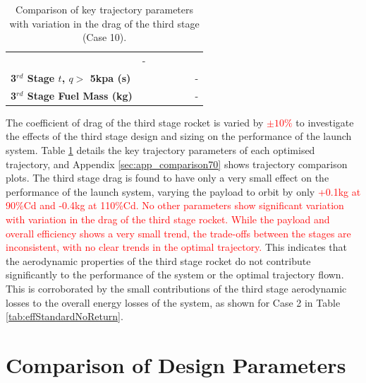 \begin{table}[ht]
\begin{tabular}{l c c c c c c}
			& -
			\\
			\textbf{3$^{rd}$ Stage $t$, $q >$ 5kpa (s)}
			& \thirdqOverFiveCdThreeNinetyNoReturn
			& \thirdqOverFiveCdThreeNinetyFiveNoReturn
			& \thirdqOverFiveCdThreeStandardNoReturn
			& \thirdqOverFiveCdThreeOneOneHundredFiveNoReturn
			& \thirdqOverFiveCdThreeOneHundredTenNoReturn
			& -
			\\
			\textbf{3$^{rd}$ Stage Fuel Mass (kg)}
			& \thirdmFuelCdThreeNinetyNoReturn
			& \thirdmFuelCdThreeNinetyFiveNoReturn
			& \thirdmFuelCdThreeStandardNoReturn
			& \thirdmFuelCdThreeOneOneHundredFiveNoReturn
			& \thirdmFuelCdThreeOneHundredTenNoReturn
			& -
			\\
			\hline 
		\end{tabular} 
	\caption{Comparison of key trajectory parameters with variation in the drag of the third stage (Case 10).}
	\label{tab:comparison70}
	
\end{table}

The coefficient of drag of the third stage rocket is varied by \textcolor{red}{$\pm10\%$} to investigate the effects of the third stage design and sizing on the performance of the launch system. Table \ref{tab:comparison70} details the key trajectory parameters of each optimised trajectory, and Appendix \ref{sec:app_comparison70} shows trajectory comparison plots. The third stage drag is found to have only a very small effect on the performance of the launch system, varying the payload to orbit by only \textcolor{red}{+0.1kg at 90\%Cd and -0.4kg at 110\%Cd. No other parameters show significant variation with variation in the drag of the third stage rocket. While the payload and overall efficiency shows a very small trend, the trade-offs between the stages are inconsistent, with no clear trends in the optimal trajectory.} This indicates that the aerodynamic properties of the third stage rocket do not contribute significantly to the performance of the system or the optimal trajectory flown. This is corroborated by the small contributions of the third stage aerodynamic losses to the overall energy losses of the system, as shown for Case 2 in Table \ref{tab:effStandardNoReturn}. 



\section{Comparison of Design Parameters}\label{sec:comparisonNoReturn}


